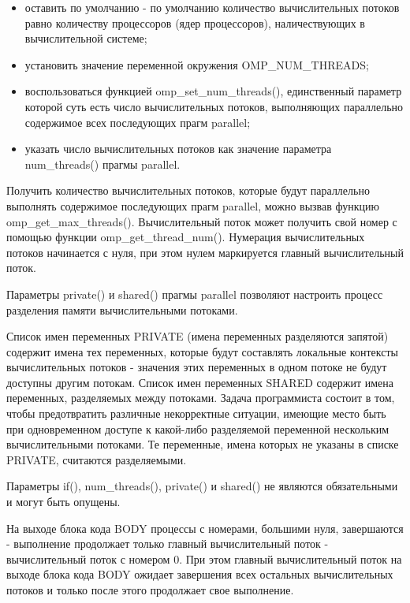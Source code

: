 \begin{itemize}

	\item оставить по умолчанию - по умолчанию количество вычислительных потоков равно количеству процессоров (ядер процессоров), наличествующих в вычислительной системе;
	\item установить значение переменной окружения OMP\_NUM\_THREADS;
	\item воспользоваться функцией omp\_set\_num\_threads(), единственный параметр которой суть есть число вычислительных потоков, выполняющих параллельно содержимое всех последующих прагм parallel;
	\item указать число вычислительных потоков как значение параметра num\_threads() прагмы parallel.

\end{itemize}

Получить количество вычислительных потоков, которые будут параллельно выполнять содержимое последующих прагм parallel, можно вызвав функцию omp\_get\_max\_threads(). Вычислительный поток может получить свой номер с помощью функции omp\_get\_thread\_num(). Нумерация вычислительных потоков начинается с нуля, при этом нулем маркируется главный вычислительный поток.

Параметры private() и shared() прагмы parallel позволяют настроить процесс разделения памяти вычислительными потоками.

Список имен переменных PRIVATE (имена переменных разделяются запятой) содержит имена тех переменных, которые будут составлять локальные контексты вычислительных потоков - значения этих переменных в одном потоке не будут доступны другим потокам. Список имен переменных SHARED содержит имена переменных, разделяемых между потоками. Задача программиста состоит в том, чтобы предотвратить различные некорректные ситуации, имеющие место быть при одновременном доступе к какой-либо разделяемой переменной нескольким вычислительными потоками. Те переменные, имена которых не указаны в списке PRIVATE, считаются разделяемыми.

Параметры if(), num\_threads(), private() и shared() не являются обязательными и могут быть опущены.

На выходе блока кода BODY процессы с номерами, большими нуля, завершаются - выполнение продолжает только главный вычислительный поток - вычислительный поток с номером 0. При этом главный вычислительный поток на выходе блока кода BODY ожидает завершения всех остальных вычислительных потоков и только после этого продолжает свое выполнение.

